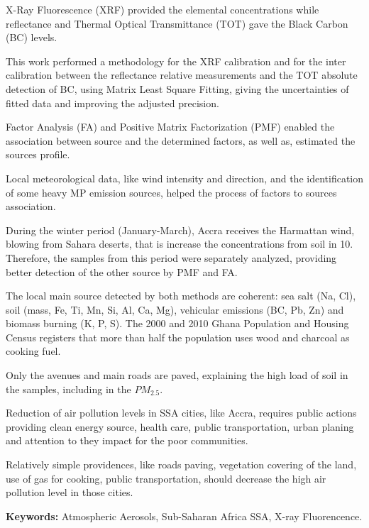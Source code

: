 X-Ray Fluorescence (XRF) provided the elemental concentrations while 
reflectance and Thermal Optical Transmittance (TOT) gave the Black 
Carbon (BC) levels. 

This work performed a methodology for the XRF calibration and for 
the inter calibration between the reflectance relative measurements 
and the TOT absolute detection of BC, 
using Matrix Least Square Fitting, giving the uncertainties of 
fitted data and improving the adjusted precision.


Factor Analysis (FA) and Positive Matrix Factorization (PMF) 
enabled the association between source and the determined factors, 
as well as, estimated the sources profile. 

Local meteorological data, like wind intensity and direction, 
and the identification of some heavy MP emission sources, 
helped the process of factors to sources association. 

During the winter period (January-March), Accra receives the 
Harmattan wind, blowing from Sahara deserts, that is increase
the concentrations from soil in 10. Therefore, the samples from 
this period were separately analyzed, providing better detection 
of the other source by PMF and FA.

The local main source detected by both methods are coherent: 
sea salt (Na, Cl), soil (mass, Fe, Ti, Mn, Si, Al, Ca, Mg), 
vehicular emissions (BC, Pb, Zn) and biomass burning (K, P, S). 
The 2000 and 2010 Ghana Population and Housing Census registers 
that more than half the population uses wood and charcoal as cooking fuel. 

Only the avenues and main roads are paved, explaining the high 
load of soil in the samples, including in the $PM_{2.5}$.

Reduction of air pollution levels in SSA cities, like Accra, 
requires public actions providing clean energy source, health care, 
public transportation, urban planing and attention to they impact for 
the poor communities. 

Relatively simple providences, like roads paving, vegetation 
covering of the land, use of gas for cooking, public transportation, 
should decrease the high air pollution level in those cities.

\par
\vspace{1em}
\noindent\textbf{Keywords:} Atmospheric Aerosols, Sub-Saharan Africa SSA, X-ray Fluorencence.

